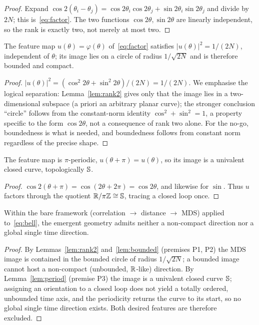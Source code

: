 \documentclass[11pt]{article}
\begin{document}
\begin{proof}
Expand $\cos2(\theta_i-\theta_j)=\cos2\theta_i\cos2\theta_j+\sin2\theta_i\sin2\theta_j$
and divide by $2N$; this is~\eqref{eq:factor}. The two functions $\cos2\theta,\sin2\theta$
are linearly independent, so the rank is exactly two, not merely at most two.
\end{proof}

\begin{lemma}\label{lem:bounded}
The feature map $u(\theta)=\varphi(\theta)$ of~\eqref{eq:factor} satisfies
$|u(\theta)|^{2}=1/(2N)$, independent of $\theta$; its image lies on a circle of radius
$1/\sqrt{2N}$ and is therefore bounded and compact.
\end{lemma}

\begin{proof}
$|u(\theta)|^2=(\cos^2 2\theta+\sin^2 2\theta)/(2N)=1/(2N)$. We emphasise the logical
separation: Lemma~\ref{lem:rank2} gives only that the image lies in a two-dimensional
subspace (a priori an arbitrary planar curve); the stronger conclusion ``circle'' follows
from the constant-norm identity $\cos^2+\sin^2=1$, a property specific to the form
$\cos2\theta$, not a consequence of rank two alone. For the no-go, boundedness is what is
needed, and boundedness follows from constant norm regardless of the precise shape.
\end{proof}

\begin{lemma}\label{lem:period}
The feature map is $\pi$-periodic, $u(\theta+\pi)=u(\theta)$, so its image is a univalent
closed curve, topologically $\mathbb{S}$.
\end{lemma}

\begin{proof}
$\cos2(\theta+\pi)=\cos(2\theta+2\pi)=\cos2\theta$, and likewise for $\sin$. Thus
$u$ factors through the quotient $\mathbb{R}/\pi\mathbb{Z}\cong\mathbb{S}$, tracing a closed loop once.
\end{proof}

\begin{theorem}[Main no-go]\label{thm:nogo}
Within the bare framework (correlation $\to$ distance $\to$ MDS) applied to~\eqref{eq:bell},
the emergent geometry admits neither a non-compact direction nor a global single time
direction.
\end{theorem}

\begin{proof}
By Lemmas~\ref{lem:rank2} and~\ref{lem:bounded} (premises P1, P2) the MDS image is
contained in the bounded circle of radius $1/\sqrt{2N}$; a bounded image cannot host a
non-compact (unbounded, $\mathbb{R}$-like) direction. By Lemma~\ref{lem:period} (premise P3) the
image is a univalent closed curve $\mathbb{S}$; assigning an orientation to a closed loop does
not yield a totally ordered, unbounded time axis, and the periodicity returns the curve to
its start, so no global single time direction exists. Both desired features are therefore
excluded. \qedhere
\end{proof}
\end{document}
